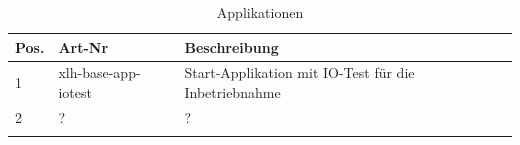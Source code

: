 \documentclass[10pt]{datasheet}
\begin{document}
\begin{table}[h]
\begin{threeparttable}
\caption{Applikationen \xlhPlattformID}
    \begin{tabularx}{\textwidth}{l | l | l }
        \thickhline
        \textbf{Pos.} & \textbf{Art-Nr} & \textbf{Beschreibung} \\
        \hline
        1 & xlh-base-app-iotest & Start-Applikation mit IO-Test für die Inbetriebnahme \\
        2 & ? & ?  \\
        \thickhline
    \end{tabularx}

\label{tab:applikationen}
\end{threeparttable}
\end{table}
\end{document}
